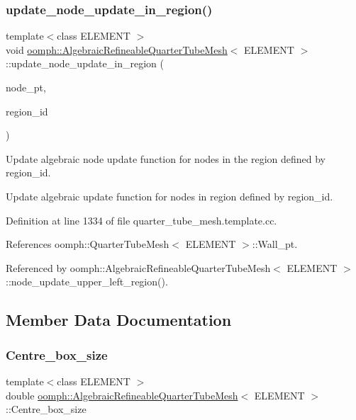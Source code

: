 \subsubsection{\texorpdfstring{update\+\_\+node\+\_\+update\+\_\+in\+\_\+region()}{update\_node\_update\_in\_region()}}
{\footnotesize\ttfamily template$<$class E\+L\+E\+M\+E\+NT $>$ \\
void \hyperlink{classoomph_1_1AlgebraicRefineableQuarterTubeMesh}{oomph\+::\+Algebraic\+Refineable\+Quarter\+Tube\+Mesh}$<$ E\+L\+E\+M\+E\+NT $>$\+::update\+\_\+node\+\_\+update\+\_\+in\+\_\+region (\begin{DoxyParamCaption}\item[{Algebraic\+Node $\ast$\&}]{node\+\_\+pt,  }\item[{int \&}]{region\+\_\+id }\end{DoxyParamCaption})\hspace{0.3cm}{\ttfamily [private]}}



Update algebraic node update function for nodes in the region defined by region\+\_\+id. 

Update algebraic update function for nodes in region defined by region\+\_\+id. 

Definition at line 1334 of file quarter\+\_\+tube\+\_\+mesh.\+template.\+cc.



References oomph\+::\+Quarter\+Tube\+Mesh$<$ E\+L\+E\+M\+E\+N\+T $>$\+::\+Wall\+\_\+pt.



Referenced by oomph\+::\+Algebraic\+Refineable\+Quarter\+Tube\+Mesh$<$ E\+L\+E\+M\+E\+N\+T $>$\+::node\+\_\+update\+\_\+upper\+\_\+left\+\_\+region().



\subsection{Member Data Documentation}
\mbox{\label{classoomph_1_1AlgebraicRefineableQuarterTubeMesh_a6006bcac5688f832ff2b6cbaae65102a}} 
\subsubsection{\texorpdfstring{Centre\+\_\+box\+\_\+size}{Centre\_box\_size}}
{\footnotesize\ttfamily template$<$class E\+L\+E\+M\+E\+NT $>$ \\
double \hyperlink{classoomph_1_1AlgebraicRefineableQuarterTubeMesh}{oomph\+::\+Algebraic\+Refineable\+Quarter\+Tube\+Mesh}$<$ E\+L\+E\+M\+E\+NT $>$\+::Centre\+\_\+box\+\_\+size\hspace{0.3cm}{\ttfamily [private]}}



